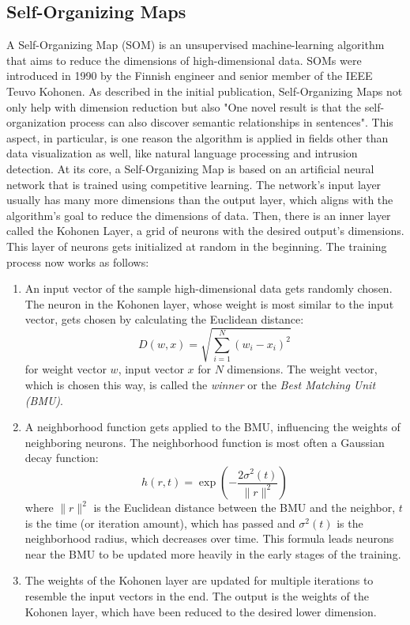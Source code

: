 \documentclass[
    fontsize=12pt,
    headings=small,
    parskip=half,           %
    bibliography=totoc,
    numbers=noenddot,       %
    open=any,               %
    ]{scrreprt}
\begin{document}
\subsection{Self-Organizing Maps}
\label{subsec:self-organizing_maps}
A Self-Organizing Map (SOM) is an unsupervised machine-learning algorithm that aims to reduce the dimensions of high-dimensional data. SOMs were introduced in 1990 by the Finnish engineer and senior member of the IEEE Teuvo Kohonen. As described in the initial publication, Self-Organizing Maps not only help with dimension reduction but also "One novel result is that the self-organization process can also discover semantic relationships in sentences". This aspect, in particular, is one reason the algorithm is applied in fields other than data visualization as well, like natural language processing and intrusion detection. At its core, a Self-Organizing Map is based on an artificial neural network that is trained using competitive learning. The network's input layer usually has many more dimensions than the output layer, which aligns with the algorithm's goal to reduce the dimensions of data. Then, there is an inner layer called the Kohonen Layer, a grid of neurons with the desired output's dimensions. This layer of neurons gets initialized at random in the beginning. The training process now works as follows:
\begin{enumerate}
	\item An input vector of the sample high-dimensional data gets randomly chosen. The neuron in the Kohonen layer, whose weight is most similar to the input vector, gets chosen by calculating the Euclidean distance: $$D(w, x) = \sqrt{\sum_{i=1}^{N} (w_i - x_i)^2}$$ for weight vector $w$, input vector $x$ for $N$ dimensions. The weight vector, which is chosen this way, is called the \emph{winner} or the \emph{Best Matching Unit (BMU)}.
	\item A neighborhood function gets applied to the BMU, influencing the weights of neighboring neurons. The neighborhood function is most often a Gaussian decay function: $$h(r, t) = \exp\left(-\frac{2\sigma^2(t)}{\|r\|^2}\right)$$ where $\|r\|^2$ is the Euclidean distance between the BMU and the neighbor, $t$ is the time (or iteration amount), which has passed and $\sigma^2(t)$ is the neighborhood radius, which decreases over time. This formula leads neurons near the BMU to be updated more heavily in the early stages of the training.
	\item The weights of the Kohonen layer are updated for multiple iterations to resemble the input vectors in the end. The output is the weights of the Kohonen layer, which have been reduced to the desired lower dimension.
\end{enumerate}
\end{document}
